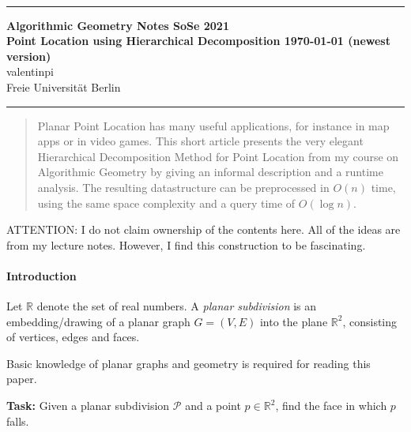 \documentclass[10pt,fleqn]{article}
\theoremstyle{definition}
\theoremstyle{remark}
\newcommand{\Authors}{valentinpi}
\begin{document}
\vspace*{-12ex}
\phantom{}\\
\noindent\rule{\textwidth}{0.1pt}
\large \textbf{Algorithmic Geometry Notes \hfill SoSe 2021} \vspace*{0.25cm}\\
\normalsize \textbf{Point Location using Hierarchical Decomposition \hfill \today { (newest version)}}\\
\Authors\\
Freie Universität Berlin\\
\noindent\rule{\textwidth}{0.1pt}

\begin{abstract}
    \noindent Planar Point Location has many useful applications, for instance in map apps or in video games. This short article presents the very elegant Hierarchical Decomposition Method for Point Location from my course on Algorithmic Geometry by giving an informal description and a runtime analysis. The resulting datastructure can be preprocessed in \(O(n)\) time, using the same space complexity and a query time of \(O(\log{n})\).
\end{abstract}

\vspace{\baselineskip}

ATTENTION: I do not claim ownership of the contents here. All of the ideas are from my lecture notes. However, I find this construction to be fascinating.

\paragraph{Introduction} Let \(\mathbb{R}\) denote the set of real numbers. A \emph{planar subdivision} is an embedding/drawing of a planar graph \(G = (V, E)\) into the plane \(\mathbb{R}^2\), consisting of vertices, edges and faces.

Basic knowledge of planar graphs and geometry is required for reading this paper.

\vspace{\baselineskip}

\textbf{Task:} Given a planar subdivision \(\mathcal{P}\) and a point \(p \in \mathbb{R}^2\), find the face in which \(p\) falls.
\end{document}
